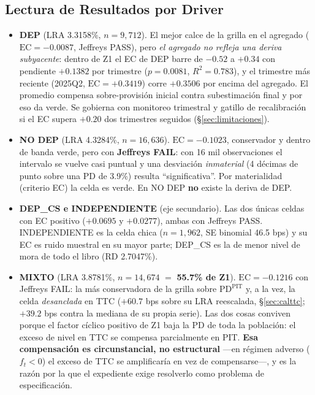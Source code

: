 \documentclass[12pt, a4paper]{article}
\newcommand{\PDPIT}{\ensuremath{\mathrm{PD}^{\mathrm{PIT}}}}
\newcommand{\ft}{\ensuremath{f_t}}
\newcommand{\EC}{\ensuremath{\mathrm{EC}}}
\begin{document}
\subsection{Lectura de Resultados por Driver}
\label{sec:lectura}
\begin{itemize}[nosep]
  \item \textbf{DEP} (LRA 3.3158\%, $n=9{,}712$). El mejor calce de la grilla en el agregado
    ($\EC=-0.0087$, Jeffreys PASS), pero \emph{el agregado no refleja una deriva subyacente}: dentro de Z1 el EC
    de DEP barre de $-0.52$ a $+0.34$ con pendiente $+0.1382$ por trimestre ($p=0.0081$,
    $R^2=0.783$), y el trimestre más reciente (2025Q2, $\EC=+0.3419$) corre $+0.3506$ por encima del
    agregado. El promedio compensa sobre-provisión inicial contra subestimación final y por eso da
    verde. Se gobierna con monitoreo trimestral
    y gatillo de recalibración si el EC supera $+0.20$ dos trimestres seguidos
    (\S\ref{sec:limitaciones}).
  \item \textbf{NO DEP} (LRA 4.3284\%, $n=16{,}636$). $\EC=-0.1023$, conservador y dentro de banda
    verde, pero con \textbf{Jeffreys FAIL}: con 16 mil observaciones el intervalo se vuelve casi
    puntual y una desviación \emph{inmaterial} (4 décimas de punto sobre una PD de 3.9\%) resulta
    ``significativa''. Por materialidad (criterio EC) la celda es verde. En NO DEP \textbf{no} existe
    la deriva de DEP.
  \item \textbf{DEP\_CS e INDEPENDIENTE} (eje secundario). Las dos únicas celdas con EC positivo
    ($+0.0695$ y $+0.0277$), ambas con Jeffreys PASS. INDEPENDIENTE es la celda chica
    ($n=1{,}962$, SE binomial 46.5 bps) y su EC es ruido muestral en su mayor parte; DEP\_CS es la
    de menor nivel de mora de todo el libro (RD 2.7047\%).
  \item \textbf{MIXTO} (LRA 3.8781\%, $n=14{,}674$ $=$ \textbf{55.7\% de Z1}). $\EC=-0.1216$ con
    Jeffreys FAIL: la más conservadora de la grilla sobre $\PDPIT$ y, a la vez, la celda
    \emph{desanclada} en TTC ($+60.7$ bps sobre su LRA reescalada, \S\ref{sec:calttc}; $+39.2$ bps
    contra la mediana de su propia serie). Las dos cosas conviven porque el factor cíclico positivo
    de Z1 baja la PD de toda la población: el exceso de nivel en TTC se compensa parcialmente en
    PIT. \textbf{Esa compensación es circunstancial, no estructural} ---en régimen adverso
    ($\ft<0$) el exceso de TTC se amplificaría en vez de compensarse---, y es la razón por la que el
    expediente exige resolverlo como problema de especificación.
\end{itemize}
\end{document}
